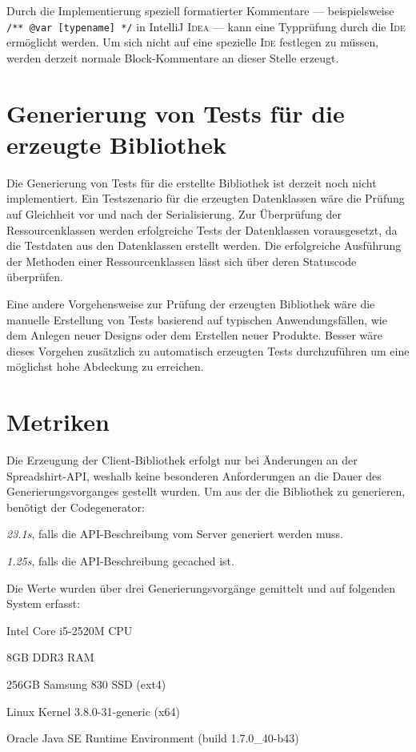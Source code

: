 Durch die Implementierung speziell formatierter Kommentare --- beispielsweise \texttt{/** @var [typename] */} in IntelliJ \textsc{Idea} --- kann eine Typprüfung durch die \textsc{Ide} ermöglicht werden. Um sich nicht auf eine spezielle \textsc{Ide} festlegen zu müssen, werden derzeit normale Block-Kommentare an dieser Stelle erzeugt.

\section{Generierung von Tests für die erzeugte Bibliothek}
\label{sec:test_coverage}

Die Generierung von Tests für die erstellte Bibliothek ist derzeit noch nicht implementiert. Ein Testszenario für die erzeugten Datenklassen wäre die Prüfung auf Gleichheit vor und nach der Serialisierung. Zur Überprüfung der Ressourcenklassen werden erfolgreiche Tests der Datenklassen vorausgesetzt, da die Testdaten aus den Datenklassen erstellt werden. Die erfolgreiche Ausführung der Methoden einer Ressourcenklassen lässt sich über deren Statuscode überprüfen.

Eine andere Vorgehensweise zur Prüfung der erzeugten Bibliothek wäre die manuelle Erstellung von Tests basierend auf typischen Anwendungsfällen, wie dem Anlegen neuer Designs oder dem Erstellen neuer Produkte. Besser wäre dieses Vorgehen zusätzlich zu automatisch erzeugten Tests durchzuführen um eine möglichst hohe Abdeckung zu erreichen.

\section{Metriken}
\label{sec:codemetrics}

Die Erzeugung der Client-Bibliothek erfolgt nur bei Änderungen an der Spreadshirt-\gls{API}, weshalb keine besonderen Anforderungen an die Dauer des Generierungsvorganges gestellt wurden. Um aus der  \cite{WADL} die Bibliothek zu generieren, benötigt der Codegenerator:
\begin{compactitem}
  \item \emph{23.1s}, falls die \gls{API}-Beschreibung vom Server generiert werden muss.
  \item \emph{1.25s}, falls die \gls{API}-Beschreibung gecached ist. 
\end{compactitem}

Die Werte wurden über drei Generierungsvorgänge gemittelt und auf folgenden System erfasst:
\begin{compactitem}
  \item Intel\textsuperscript{\textregistered{}} Core\texttrademark{} i5-2520M CPU
  \item 8GB DDR3 RAM
  \item 256GB Samsung\textsuperscript{\textregistered{}} 830 SSD (ext4)
  \item Linux Kernel 3.8.0-31-generic (x64)
  \item Oracle\textsuperscript{\textregistered{}} Java\texttrademark{} SE Runtime Environment (build 1.7.0\_40-b43)
\end{compactitem}

